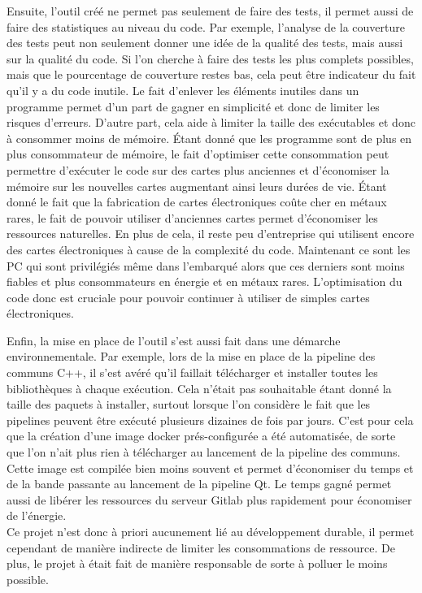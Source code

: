 \documentclass[a4paper]{article}
\begin{document}
Ensuite, l'outil créé ne permet pas seulement de faire des tests, il permet
aussi de faire des statistiques au niveau du code. Par exemple, l'analyse de la
couverture des tests peut non seulement donner une idée de la qualité des tests,
mais aussi sur la qualité du code. Si l'on cherche à faire des tests les plus
complets possibles, mais que le pourcentage de couverture restes bas, cela peut
être indicateur du fait qu'il y a du code inutile. Le fait d'enlever les
éléments inutiles dans un programme permet d'un part de gagner en simplicité et
donc de limiter les risques d'erreurs. D'autre part, cela aide à limiter la
taille des exécutables et donc à consommer moins de mémoire. Étant donné que les
programme sont de plus en plus consommateur de mémoire, le fait d'optimiser
cette consommation peut permettre d'exécuter le code sur des cartes plus
anciennes et d'économiser la mémoire sur les nouvelles cartes augmentant ainsi
leurs durées de vie. Étant donné le fait que la fabrication de cartes
électroniques coûte cher en métaux rares, le fait de pouvoir utiliser
d'anciennes cartes permet d'économiser les ressources naturelles. En plus de
cela, il reste peu d'entreprise qui utilisent encore des cartes électroniques à
cause de la complexité du code. Maintenant ce sont les PC qui sont privilégiés
même dans l'embarqué alors que ces derniers sont moins fiables et plus
consommateurs en énergie et en métaux rares. L'optimisation du code donc est
cruciale pour pouvoir continuer à utiliser de simples cartes électroniques.

Enfin, la mise en place de l'outil s'est aussi fait dans une démarche
environnementale. Par exemple, lors de la mise en place de la pipeline des
communs C++, il s'est avéré qu'il faillait télécharger et installer toutes les
bibliothèques à chaque exécution. Cela n'était pas souhaitable étant donné la
taille des paquets à installer, surtout lorsque l'on considère le fait que les
pipelines peuvent être exécuté plusieurs dizaines de fois par jours. C'est pour
cela que la création d'une image docker prés-configurée a été automatisée, de
sorte que l'on n'ait plus rien à télécharger au lancement de la pipeline des
communs. Cette image est compilée bien moins souvent et permet d'économiser du
temps et de la bande passante au lancement de la pipeline Qt. Le temps gagné
permet aussi de libérer les ressources du serveur Gitlab plus rapidement pour
économiser de l'énergie.\\

Ce projet n'est donc à priori aucunement lié au développement durable, il permet
cependant de manière indirecte de limiter les consommations de ressource. De
plus, le projet à était fait de manière responsable de sorte à polluer le moins
possible.
\end{document}
